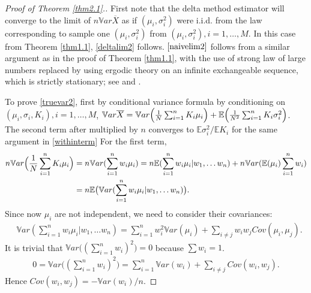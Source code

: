 \documentclass[10pt]{article}
\newcommand{\var}{\ensuremath{\mathbb Var}}
\newcommand{\bbe}{\mathbb{E}}
\newcommand{\ci}{\citeasnoun}
\newcommand{\xbar}{\overline{X}}
\begin{document}
\begin{proof}[Proof of Theorem \ref{thm2.1}.]
First note that the delta method estimator will converge to the limit of $n\var \xbar$ as if $(\mu_i,\sigma_i^2)$ were i.i.d. from the law corresponding to sample one $(\mu_i,\sigma_i^2)$ from $(\mu_i,\sigma_i^2), i=1,\dots,M$. In this case from Theorem \ref{thm1.1}, \eqref{deltalim2} follows. $\eqref{naivelim2}$ follows from a similar argument as in the proof of Theorem \ref{thm1.1}, with the use of strong law of large numbers replaced by using ergodic theory on an infinite exchangeable sequence, which is strictly stationary; see \ci[Chapter 10]{asympstat} and \ci{exchangewiki}. 

To prove \ref{truevar2}, first by conditional variance formula by conditioning on $(\mu_i,\sigma_i, K_i), i=1,\dots,M$, $\var \xbar = \var \Bigl(\frac{1}{N}\sum_{i=1}^n K_i \mu_i \Bigr)+\bbe \Bigl(\frac{1}{N^2}\sum_{i=1}^n K_i \sigma^2_i \Bigr)$. The second term after multiplied by $n$ converges to $\bbe \sigma_i^2/\bbe K_i$ for the same argument in \eqref{withinterm}
For the first term, 
\begin{align*}
n\var \Bigl(\frac{1}{N}\sum_{i=1}^n K_i \mu_i \Bigr) & = n\var (\sum_{i=1}^n w_i \mu_i) = n\bbe (\sum_{i=1}^n w_i \mu_i| w_1,\dots w_n) + n\var( \bbe(\mu_i)\sum_{i=1}^n w_i)\\
&  =  n\bbe \bigl(\var(\sum_{i=1}^n w_i \mu_i| w_1,\dots w_n) \bigr). 
\end{align*}
Since now $\mu_i$ are not independent, we need to consider their covariances:
\begin{align*}
&\var(\sum_{i=1}^n w_i \mu_i| w_1,\dots w_n) = \sum_{i=1}^nw_i^2 \var(\mu_i) + \sum_{i\neq j} w_i w_j Cov(\mu_i,\mu_j).
\end{align*}
It is trivial that $\var \bigl((\sum_{i=1}^n w_i)^2\bigr) =0$ because $\sum w_i =1$. 
\begin{align*}
0 = \var \bigl((\sum_{i=1}^n w_i)^2\bigr) = \sum_{i=1}^n \var(w_i) + \sum_{i\neq j} Cov(w_i,w_j). 
\end{align*}
Hence $Cov(w_i,w_j)=-\var(w_i)/n$.


\end{proof}
\end{document}
